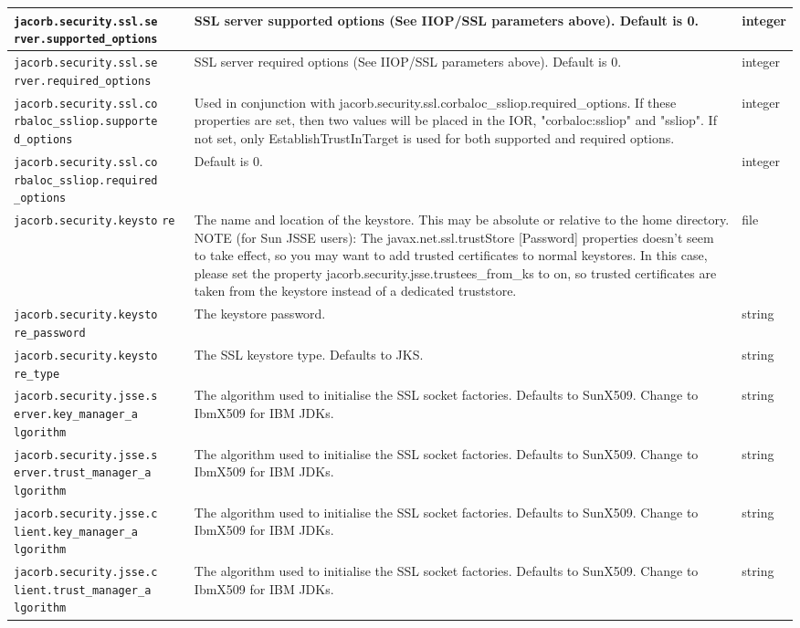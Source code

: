 \begin{small}
\begin{longtable}{|p{5cm}|p{9cm}|p{2cm}|}
\verb"jacorb.security.ssl.se"
\verb"rver.supported_options" & SSL server supported options (See IIOP/SSL parameters above). Default is 0. & integer \\
\hline
\verb"jacorb.security.ssl.se"
\verb"rver.required_options" & SSL server required options (See IIOP/SSL parameters above). Default is 0. & integer \\
\hline
\verb"jacorb.security.ssl.co"
\verb"rbaloc_ssliop.supporte"
\verb"d_options" & Used in conjunction with jacorb.security.ssl.corbaloc\_ssliop.required\_options. If these properties are set, then two values will be placed in the IOR, "corbaloc:ssliop" and "ssliop". If not set, only EstablishTrustInTarget is used for both supported and required options. & integer \\
\hline
\verb"jacorb.security.ssl.co"
\verb"rbaloc_ssliop.required"
\verb"_options" &  Default is 0. & integer \\
\hline
\verb"jacorb.security.keysto"
\verb"re" & The name and location of the keystore. This may be absolute or relative to the home directory. NOTE (for Sun JSSE users): The javax.net.ssl.trustStore [Password] properties doesn't seem to take effect, so you may want to add trusted certificates to normal keystores. In this case, please set the property jacorb.security.jsse.trustees\_from\_ks to on, so trusted certificates are taken from the keystore instead of a dedicated truststore.  & file \\
\hline
\verb"jacorb.security.keysto"
\verb"re_password" & The keystore password. & string \\
\hline
\verb"jacorb.security.keysto"
\verb"re_type" & The SSL keystore type. Defaults to JKS. & string \\
\hline
\verb"jacorb.security.jsse.s"
\verb"erver.key_manager_a"
\verb"lgorithm" & The algorithm used to initialise the SSL socket factories. Defaults to SunX509. Change to IbmX509 for IBM JDKs. & string \\
\hline
\verb"jacorb.security.jsse.s"
\verb"erver.trust_manager_a"
\verb"lgorithm" & The algorithm used to initialise the SSL socket factories. Defaults to SunX509. Change to IbmX509 for IBM JDKs. & string \\
\hline
\verb"jacorb.security.jsse.c"
\verb"lient.key_manager_a"
\verb"lgorithm" & The algorithm used to initialise the SSL socket factories. Defaults to SunX509. Change to IbmX509 for IBM JDKs. & string \\
\hline
\verb"jacorb.security.jsse.c"
\verb"lient.trust_manager_a"
\verb"lgorithm" & The algorithm used to initialise the SSL socket factories. Defaults to SunX509. Change to IbmX509 for IBM JDKs. & string \\

\end{longtable}
\end{small}
